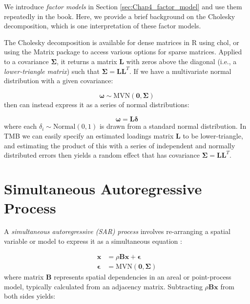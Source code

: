 We introduce \textit{factor models} in Section \ref{sec:Chap4_factor_model} and use them repeatedly in the book.  Here, we provide a brief background on the Cholesky decomposition, which is one interpretation of these factor models. 

The Cholesky decomposition is available for dense matrices in R using \colorbox{backcolour}{chol}, or using the \colorbox{backcolour}{Matrix} package to access various options for sparse matrices.  Applied to a covariance \(\mathbf{\Sigma}\), it returns a matrix \(\mathbf{L}\) with zeros above the diagonal (i.e., a \textit{lower-triangle matrix}) such that \(\mathbf{\Sigma = LL}^T\). If we have a multivariate normal distribution with a given covariance:

\begin{equation}
    \mathbf{\omega} \sim \mathrm{MVN}(\mathbf{0,\Sigma})
\end{equation}
then can instead express it as a series of normal distributions:
    
\begin{equation}
    \mathbf{\omega} = \mathbf{L \delta}
\end{equation}
where each \( \delta_i \sim \mathrm{Normal}(0,1) \) is drawn from a standard normal distribution.  In TMB we can easily specify an estimated loadings matrix \( \mathbf{L} \) to be lower-triangle, and estimating the product of this with a series of independent and normally distributed errors then yields a random effect that has covariance \(\mathbf{\Sigma = LL}^T\).  

\section{Simultaneous Autoregressive Process}\label{sec:Appendix_SAR}

A \textit{{simultaneous autoregressive (SAR) process}} involves re-arranging a spatial variable or model to express it as a simultaneous equation \cite{ver_hoef_relationship_2018}:

\begin{equation} \label{eq:Appendix_SAR_process}
\begin{aligned}
    \mathbf{x} &= \rho \mathbf{Bx + \epsilon} \\
    \mathbf{\epsilon} &= \mathrm{MVN}( \mathbf{0, \Sigma} )
\end{aligned}
\end{equation}
where matrix \(\mathbf{B}\) represents spatial dependencies in an areal or point-process model, typically calculated from an adjacency matrix.  Subtracting \( \rho \mathbf{Bx} \) from both sides yields:

